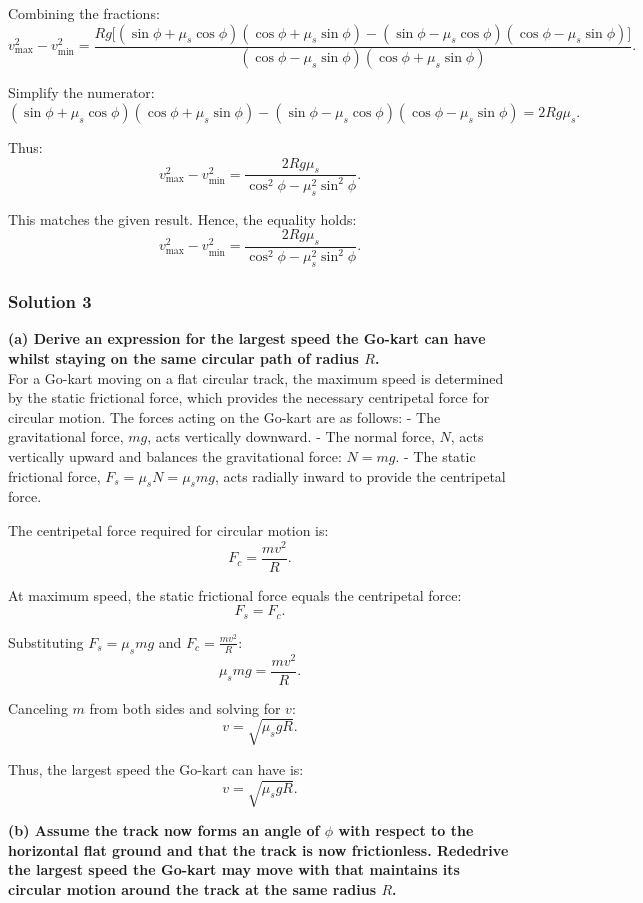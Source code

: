 \documentclass{article}
\begin{document}
Combining the fractions:
\[
v_{\text{max}}^2 - v_{\text{min}}^2 = \frac{Rg \big[(\sin\phi + \mu_s \cos\phi)(\cos\phi + \mu_s \sin\phi) - (\sin\phi - \mu_s \cos\phi)(\cos\phi - \mu_s \sin\phi)\big]}{(\cos\phi - \mu_s \sin\phi)(\cos\phi + \mu_s \sin\phi)}.
\]

Simplify the numerator:
\[
(\sin\phi + \mu_s \cos\phi)(\cos\phi + \mu_s \sin\phi) - (\sin\phi - \mu_s \cos\phi)(\cos\phi - \mu_s \sin\phi) = 2Rg\mu_s.
\]

Thus:
\[
v_{\text{max}}^2 - v_{\text{min}}^2 = \frac{2Rg\mu_s}{\cos^2\phi - \mu_s^2 \sin^2\phi}.
\]

This matches the given result. Hence, the equality holds:
\[
\boxed{v_{\text{max}}^2 - v_{\text{min}}^2 = \frac{2Rg\mu_s}{\cos^2\phi - \mu_s^2 \sin^2\phi}}.
\]

\subsubsection{Solution 3}

\textbf{(a) Derive an expression for the largest speed the Go-kart can have whilst staying on the same circular path of radius $R$.} \\

For a Go-kart moving on a flat circular track, the maximum speed is determined by the static frictional force, which provides the necessary centripetal force for circular motion. The forces acting on the Go-kart are as follows:
- The gravitational force, $mg$, acts vertically downward.
- The normal force, $N$, acts vertically upward and balances the gravitational force: $N = mg$.
- The static frictional force, $F_s = \mu_s N = \mu_s mg$, acts radially inward to provide the centripetal force.

The centripetal force required for circular motion is:
\[
F_c = \frac{mv^2}{R}.
\]

At maximum speed, the static frictional force equals the centripetal force:
\[
F_s = F_c.
\]

Substituting $F_s = \mu_s mg$ and $F_c = \frac{mv^2}{R}$:
\[
\mu_s mg = \frac{mv^2}{R}.
\]

Canceling $m$ from both sides and solving for $v$:
\[
v = \sqrt{\mu_s g R}.
\]

Thus, the largest speed the Go-kart can have is:
\[
\boxed{v = \sqrt{\mu_s g R}}.
\]

\textbf{(b) Assume the track now forms an angle of $\phi$ with respect to the horizontal flat ground and that the track is now frictionless. Rededrive the largest speed the Go-kart may move with that maintains its circular motion around the track at the same radius $R$.} \\
\end{document}
